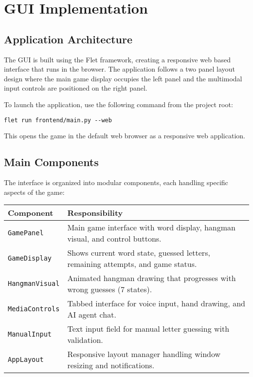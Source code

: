 \section{GUI Implementation}

\subsection*{Application Architecture}

The GUI is built using the Flet framework, creating a responsive web based interface that runs in the browser. The application follows a two panel layout design where the main game display occupies the left panel and the multimodal input controls are positioned on the right panel.

To launch the application, use the following command from the project root:

\begin{lstlisting}[caption={Starting the Frontend Application}]
flet run frontend/main.py --web
\end{lstlisting}

This opens the game in the default web browser as a responsive web application.

\subsection*{Main Components}

The interface is organized into modular components, each handling specific aspects of the game:

\begin{center}
\begin{tabularx}{\linewidth}{@{}lX@{}}
\toprule
\textbf{Component} & \textbf{Responsibility} \\ \midrule
\texttt{GamePanel}        & Main game interface with word display, hangman visual, and control buttons. \\
\texttt{GameDisplay}      & Shows current word state, guessed letters, remaining attempts, and game status. \\
\texttt{HangmanVisual}    & Animated hangman drawing that progresses with wrong guesses (7 states). \\
\texttt{MediaControls}    & Tabbed interface for voice input, hand drawing, and AI agent chat. \\
\texttt{ManualInput}      & Text input field for manual letter guessing with validation. \\
\texttt{AppLayout}        & Responsive layout manager handling window resizing and notifications. \\ \bottomrule
\end{tabularx}
\end{center}


